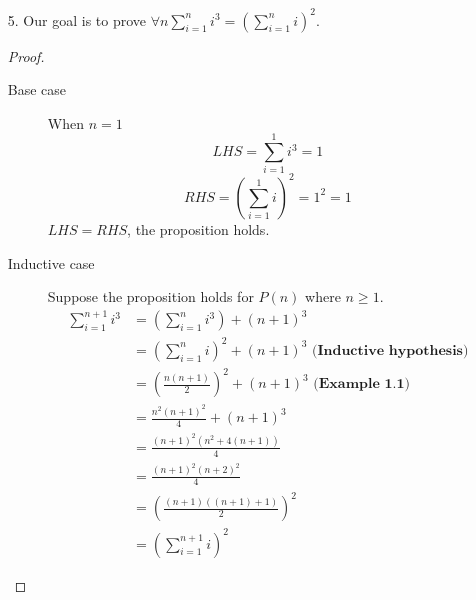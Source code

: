 \documentclass{article}
\begin{document}
\begin{itemize}
\item [5.]
  Our goal is to prove $\forall n
  \sum_{i=1}^{n}i^3=(\sum_{i=1}^ni)^2$.
  \begin{proof}
    \begin{description}
    \item[Base case]
      When $n=1$
      \[LHS=\sum_{i=1}^1i^3=1\]
      \[RHS=(\sum_{i=1}^1i)^2=1^2=1\]
      $LHS=RHS$, the proposition holds.
    \item[Inductive case]
      Suppose the proposition holds for $P(n)$ where $n\geq 1$. 
      \begin{equation*}
        \begin{split}
          \sum_{i=1}^{n+1}i^3
          &= (\sum_{i=1}^{n}i^3) + (n+1)^3\\
          &= (\sum_{i=1}^{n}i)^2 + (n+1)^3 \textbf{ (Inductive
            hypothesis)}\\ 
          &= (\frac{n(n+1)}{2})^2 + (n+1)^3 \textbf{ (Example 1.1)}\\
          &= \frac{n^2(n+1)^2}{4} + (n+1)^3\\
          &= \frac{(n+1)^2(n^2+4(n+1))}{4}\\
          &= \frac{(n+1)^2(n+2)^2}{4}\\
          &= (\frac{(n+1)((n+1)+1)}{2})^2\\
          &= (\sum_{i=1}^{n+1}i)^2
        \end{split}
      \end{equation*}
    \end{description}
  \end{proof}
\end{itemize}
\end{document}
